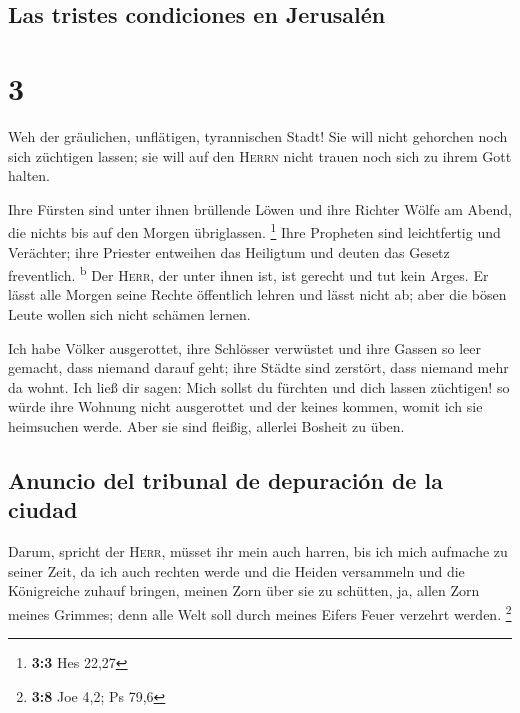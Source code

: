 \hypertarget{las-tristes-condiciones-en-jerusaluxe9n}{%
\subsection{Las tristes condiciones en
Jerusalén}\label{las-tristes-condiciones-en-jerusaluxe9n}}

\hypertarget{section-2}{%
\section{3}\label{section-2}}

 Weh der gräulichen, unflätigen, tyrannischen Stadt!
 Sie will nicht gehorchen noch sich züchtigen lassen; sie
will auf den \textsc{Herrn} nicht trauen noch sich zu ihrem Gott halten.

 Ihre Fürsten sind unter ihnen brüllende Löwen und ihre
Richter Wölfe am Abend, die nichts bis auf den Morgen übriglassen.
\footnote{\textbf{3:3} Hes 22,27}  Ihre Propheten sind
leichtfertig und Verächter; ihre Priester entweihen das Heiligtum und
deuten das Gesetz freventlich. \textsuperscript{b}  Der
\textsc{Herr}, der unter ihnen ist, ist gerecht und tut kein Arges. Er
lässt alle Morgen seine Rechte öffentlich lehren und lässt nicht ab;
aber die bösen Leute wollen sich nicht schämen lernen.

 Ich habe Völker ausgerottet, ihre Schlösser verwüstet und
ihre Gassen so leer gemacht, dass niemand darauf geht; ihre Städte sind
zerstört, dass niemand mehr da wohnt.  Ich ließ dir sagen:
Mich sollst du fürchten und dich lassen züchtigen! so würde ihre Wohnung
nicht ausgerottet und der keines kommen, womit ich sie heimsuchen werde.
Aber sie sind fleißig, allerlei Bosheit zu üben.

\hypertarget{anuncio-del-tribunal-de-depuraciuxf3n-de-la-ciudad}{%
\subsection{Anuncio del tribunal de depuración de la
ciudad}\label{anuncio-del-tribunal-de-depuraciuxf3n-de-la-ciudad}}

 Darum, spricht der \textsc{Herr}, müsset ihr mein auch
harren, bis ich mich aufmache zu seiner Zeit, da ich auch rechten werde
und die Heiden versammeln und die Königreiche zuhauf bringen, meinen
Zorn über sie zu schütten, ja, allen Zorn meines Grimmes; denn alle Welt
soll durch meines Eifers Feuer verzehrt werden. \footnote{\textbf{3:8}
  Joe 4,2; Ps 79,6}

